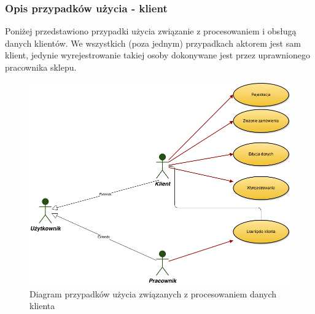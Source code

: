\subsubsection{Opis przypadków użycia - klient}

Poniżej przedstawiono przypadki użycia związanie z procesowaniem i obsługą
danych klientów. We wszystkich (poza jednym) przypadkach aktorem jest sam
klient, jedynie wyrejestrowanie takiej osoby dokonywane jest przez uprawnionego
pracownika sklepu.

\begin{figure}[h!]
    \includegraphics[width=\textwidth,
    height=0.5\textheight]{graphics/UseCase/Klient/UseCaseDiagram.png}
  \caption{Diagram przypadków użycia związanych z procesowaniem danych klienta}
\end{figure}

\newpage
\begin{enumerate}
  
  
  
  
  
\end{enumerate} 
